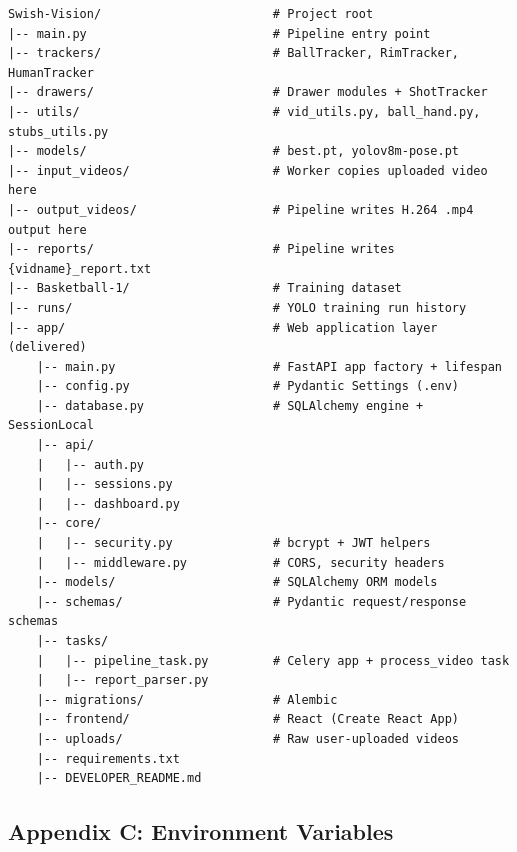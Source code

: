 ﻿\documentclass[11pt,a4paper]{article}
\begin{document}
\begin{lstlisting}
Swish-Vision/                        # Project root
|-- main.py                          # Pipeline entry point
|-- trackers/                        # BallTracker, RimTracker, HumanTracker
|-- drawers/                         # Drawer modules + ShotTracker
|-- utils/                           # vid_utils.py, ball_hand.py, stubs_utils.py
|-- models/                          # best.pt, yolov8m-pose.pt
|-- input_videos/                    # Worker copies uploaded video here
|-- output_videos/                   # Pipeline writes H.264 .mp4 output here
|-- reports/                         # Pipeline writes {vidname}_report.txt
|-- Basketball-1/                    # Training dataset
|-- runs/                            # YOLO training run history
|-- app/                             # Web application layer (delivered)
    |-- main.py                      # FastAPI app factory + lifespan
    |-- config.py                    # Pydantic Settings (.env)
    |-- database.py                  # SQLAlchemy engine + SessionLocal
    |-- api/
    |   |-- auth.py
    |   |-- sessions.py
    |   |-- dashboard.py
    |-- core/
    |   |-- security.py              # bcrypt + JWT helpers
    |   |-- middleware.py            # CORS, security headers
    |-- models/                      # SQLAlchemy ORM models
    |-- schemas/                     # Pydantic request/response schemas
    |-- tasks/
    |   |-- pipeline_task.py         # Celery app + process_video task
    |   |-- report_parser.py
    |-- migrations/                  # Alembic
    |-- frontend/                    # React (Create React App)
    |-- uploads/                     # Raw user-uploaded videos
    |-- requirements.txt
    |-- DEVELOPER_README.md
\end{lstlisting}

\subsection*{Appendix C: Environment Variables}
\end{document}
